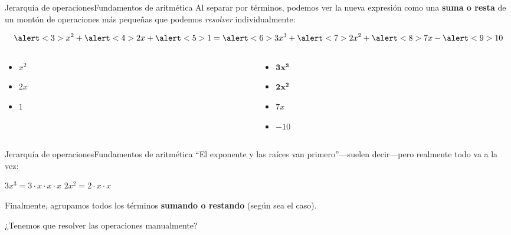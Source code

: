 \documentclass[spanish, handout]{beamer}
\begin{document}
\begin{frame}{Jerarquía de operaciones}{Fundamentos de aritmética}
    Al separar por \alert{términos}, podemos ver la nueva expresión como una \textbf{\color{magenta} suma o resta} de un montón de operaciones más pequeñas que podemos \textit{resolver} individualmente: \pause

    $$\alert<3>{x^2} + \alert<4>{2x} + \alert<5>{1} = \alert<6>{3x^3} + \alert<7>{2x^2} + \alert<8>{7x} - \alert<9>{10}$$ \pause

    \begin{columns}
        \begin{column}{0.5\textwidth}
            \begin{itemize}
                \item<3-> $x^2$
                \item<4-> $2x$
                \item<5-> $1$
            \end{itemize}
        \end{column}
        \begin{column}{0.5\textwidth}
            \begin{itemize}
                \item<6-> $\mathbf{3x^3}$
                \item<7-> $\mathbf{2x^2}$
                \item<8-> $7x$
                \item<9-> $-10$
            \end{itemize}
        \end{column}
    \end{columns}
\end{frame}

\begin{frame}{Jerarquía de operaciones}{Fundamentos de aritmética}
    ``El exponente y las raíces van primero''---suelen decir---pero realmente todo va a la vez: \pause

    \bigskip
    
    \begin{center}
        $3x^3 = 3 \cdot x \cdot x \cdot x$ \pause \hfill $2x^2 = 2 \cdot x \cdot x$
    \end{center} \pause
    
    Finalmente, agrupamos todos los términos \textbf{\color{magenta} sumando o restando} (según sea el caso). \pause

    \bigskip

    \begin{center}
        \Large
        ¿Tenemos que resolver las operaciones manualmente?
    \end{center}
\end{frame}
\end{document}
